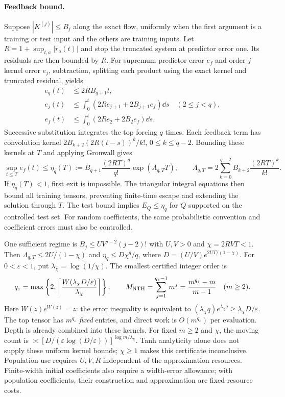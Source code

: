 \paragraph{Feedback bound.}
Suppose $|K^{(j)}|\le B_j$ along the exact flow, uniformly when the first
argument is a training or test input and the others are training inputs.
Let $R=1+\sup_{t,a}|r_a(t)|$ and stop the truncated system at predictor error
one.  Its residuals are then bounded by $R$.  For supremum predictor error
$e_f$ and order-$j$ kernel error $e_j$, subtraction, splitting each product
using the exact kernel and truncated residual, yields
\begin{align}
 e_q(t)&\le2RB_{q+1}t,\nonumber\\
 e_j(t)&\le\int_0^t(2Re_{j+1}+2B_{j+1}e_f)\dd s\quad(2\le j<q),\nonumber\\
 e_f(t)&\le\int_0^t(2Re_2+2B_2e_f)\dd s.
 \label{cmp:nth-recursion}
\end{align}
Successive substitution integrates the top forcing $q$ times.  Each feedback
term has convolution kernel $2B_{k+2}(2R(t-s))^k/k!$, $0\le k\le q-2$.
Bounding these kernels at $T$ and applying Gronwall gives
\begin{equation}
 \sup_{t\le T}e_f(t)\le\eta_q(T):=
 B_{q+1}\frac{(2RT)^q}{q!}\exp(\Lambda_{q,T}T),\qquad
 \Lambda_{q,T}=2\sum_{k=0}^{q-2}B_{k+2}\frac{(2RT)^k}{k!}.
 \label{cmp:nth-bound}
\end{equation}
If $\eta_q(T)<1$, first exit is impossible.  The triangular integral equations
then bound all training tensors, preventing finite-time escape and extending
the solution through $T$.  The test bound implies $E_Q\le\eta_q$ for $Q$
supported on the controlled test set.  For random coefficients, the same
probabilistic convention and coefficient errors must also be controlled.

One sufficient regime is $B_j\le UV^{j-2}(j-2)!$ with $U,V>0$ and
$\chi=2RVT<1$.  Then $\Lambda_{q,T}\le2U/(1-\chi)$ and
$\eta_q\le D\chi^q/q$, where $D=(U/V)e^{2UT/(1-\chi)}$.
For $0<\varepsilon<1$, put $\lambda_\chi=\log(1/\chi)$.  The smallest
certified integer order is
\begin{equation}
 q_\varepsilon=\max\left\{2,\left\lceil
 \frac{W(\lambda_\chi D/\varepsilon)}{\lambda_\chi}\right\rceil\right\},\qquad
 M_{\rm NTH}=\sum_{j=1}^{q_\varepsilon-1}m^j
 =\frac{m^{q_\varepsilon}-m}{m-1}\quad(m\ge2).
 \label{cmp:nth-memory}
\end{equation}
Here $W(z)e^{W(z)}=z$: the error inequality is equivalent to
$(\lambda_\chi q)e^{\lambda_\chi q}\ge\lambda_\chi D/\varepsilon$.
The top tensor has $m^{q_\varepsilon}$ \emph{fixed} entries, and direct work
is $O(m^{q_\varepsilon})$ per evaluation.  Depth is already combined into
these kernels.  For fixed $m\ge2$ and $\chi$, the moving count is
$\asymp[D/(\varepsilon\log(D/\varepsilon))]^{\log m/\lambda_\chi}$.
Tanh analyticity alone does not supply these uniform kernel bounds;
$\chi\ge1$ makes this certificate inconclusive.  Population use requires
$U,V,R$ independent of the approximation resources.  Finite-width initial
coefficients also require a width-error allowance; with population
coefficients, their construction and approximation are fixed-resource costs.

